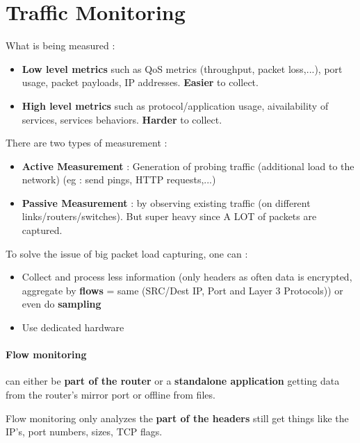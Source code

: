 \section{Traffic Monitoring}
What is being measured : 
\begin{itemize}
    \item \textbf{Low level metrics} such as QoS metrics (throughput, packet loss,...), port usage, packet payloads, IP addresses. \textbf{Easier} to collect.
    \item \textbf{High level metrics} such as protocol/application usage, aivailability of services, services behaviors. \textbf{Harder} to collect.
\end{itemize}

There are two types of measurement : 
\begin{itemize}
    \item \textbf{Active Measurement} : Generation of probing traffic (additional load to the network) (eg : send pings, HTTP requests,...)
    \item \textbf{Passive Measurement} : by observing existing traffic (on different links/routers/switches). But super heavy since A LOT of packets are captured.
\end{itemize}

To solve the issue of big packet load capturing, one can : 
\begin{itemize}
    \item Collect and process less information (only headers as often data is encrypted, aggregate by \textbf{flows} = same (SRC/Dest IP, Port and Layer 3 Protocols)) or even do \textbf{sampling}
    \item Use dedicated hardware
\end{itemize}

\paragraph{Flow monitoring} can either be \textbf{part of the router} or a \textbf{standalone application} getting data from the router's mirror port or offline from files.

Flow monitoring only analyzes the \textbf{part of the headers} still get things like the IP's, port numbers, sizes, TCP flags.


